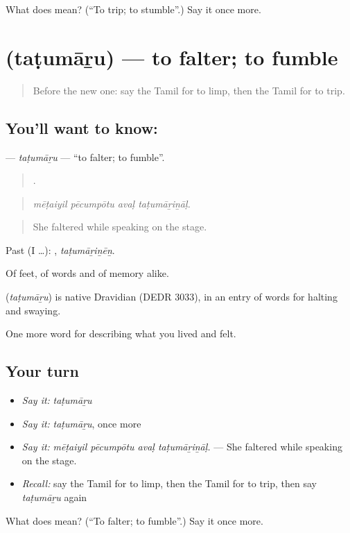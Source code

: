\begin{tcolorbox}[breakable,colback=teal!4,colframe=teal!35!black,title={Before you move on}]
What does  mean? (\textquotedblleft{}To trip; to stumble\textquotedblright{}.) Say it once more.
\end{tcolorbox}
\section[\texorpdfstring{\ta{தடுமாறு} (taṭumāṟu)}{தடுமாறு (taṭumāṟu)}]{ (taṭumāṟu) — to falter; to fumble}

\label{lesson:TA-C481-tatumaru}



\begin{quote}
Before the new one: say the Tamil for to limp, then the Tamil for to trip.
\end{quote}

\subsection*{You'll want to know: }
\textbf{} — \emph{taṭumāṟu} — \textquotedblleft{}to falter; to fumble\textquotedblright{}.

\begin{quote}
   .
\end{quote}

\begin{quote}
\emph{mēṭaiyil pēcumpōtu avaḷ taṭumāṟiṉāḷ.}
\end{quote}

\begin{quote}
She faltered while speaking on the stage.
\end{quote}

Past (I …): , \emph{taṭumāṟiṉēṉ}.

Of feet, of words and of memory alike.

\begin{cousinweb}
\textbf{} (\emph{taṭumāṟu}) is native Dravidian (DEDR 3033), in an entry of words for halting and swaying.
\end{cousinweb}

\begin{grammarlens}[title={What you've built}]
One more word for describing what you lived and felt.
\end{grammarlens}

\subsection*{Your turn}
\begin{itemize}
\raggedright
  \item \emph{Say it:} \emph{taṭumāṟu}
  \item \emph{Say it:} \emph{taṭumāṟu}, once more
  \item \emph{Say it:} \emph{mēṭaiyil pēcumpōtu avaḷ taṭumāṟiṉāḷ.} — She faltered while speaking on the stage.
  \item \emph{Recall:} say the Tamil for to limp, then the Tamil for to trip, then say \emph{taṭumāṟu} again
\end{itemize}

\begin{tcolorbox}[breakable,colback=teal!4,colframe=teal!35!black,title={Before you move on}]
What does  mean? (\textquotedblleft{}To falter; to fumble\textquotedblright{}.) Say it once more.
\end{tcolorbox}
